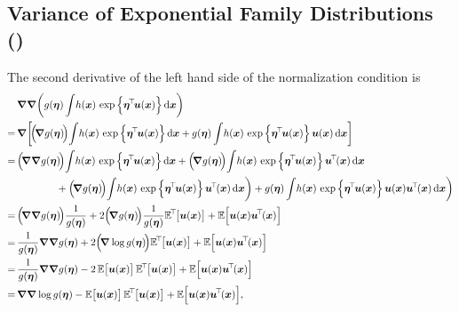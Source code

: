 \documentclass[11pt, a4paper]{scrartcl}
\newcommand{\E}{\mathbb{E}}
\newcommand{\transposed}{{\!\top\!}}
\renewcommand{\vec}[1]{\bm{#1}}
\newcommand{\diffstar}{\texorpdfstring{\raisebox{-1pt}{\resizebox{!}{8pt}{\(\star\)}}}{*}}
\newcommand{\onestar}  {(\diffstar)}
\begin{document}
		\subsection{Variance of Exponential Family Distributions  \onestar}
			The second derivative of the left hand side of the normalization condition is
			\begin{align}
				 &\, \grad \grad \bigg( g(\vec{\eta}) \int\! h(\vec{x}) \,\exp\Big\{ \vec{\eta}^\transposed \vec{u}(\vec{x}) \Big\} \dd{\vec{x}} \!\bigg) \\
				=&\, \grad \bigg[\! \Big(\! \grad{g(\vec{\eta})} \!\Big)\! \int\! h(\vec{x}) \,\exp\Big\{ \vec{\eta}^\transposed \vec{u}(\vec{x}) \Big\} \dd{\vec{x}} + g(\vec{\eta}) \int\! h(\vec{x}) \,\exp\Big\{ \vec{\eta}^\transposed \vec{u}(\vec{x}) \Big\}\, \vec{u}(\vec{x}) \dd{\vec{x}} \!\bigg] \\
				=&\, \Big(\! \grad{\grad{g(\vec{\eta})}} \!\Big)\! \int\! h(\vec{x}) \,\exp\Big\{ \vec{\eta}^\transposed \vec{u}(\vec{x}) \Big\} \dd{\vec{x}}
					+ \Big(\! \grad{g(\vec{\eta})} \!\Big)\! \int\! h(\vec{x}) \,\exp\Big\{ \vec{\eta}^\transposed \vec{u}(\vec{x}) \Big\}\, \vec{u}^\transposed(\vec{x}) \dd{\vec{x}} \\&\qquad\qquad
					+ \Big(\! \grad{g(\vec{\eta})} \!\Big)\! \int\! h(\vec{x}) \,\exp\Big\{ \vec{\eta}^\transposed \vec{u}(\vec{x}) \Big\}\, \vec{u}^\transposed(\vec{x}) \dd{\vec{x}} \!\bigg)
					+ g(\vec{\eta}) \int\! h(\vec{x}) \,\exp\Big\{ \vec{\eta}^\transposed \vec{u}(\vec{x}) \Big\}\, \vec{u}(\vec{x}) \vec{u}^\transposed(\vec{x}) \dd{\vec{x}} \!\bigg) \\
				=&\, \Big(\! \grad{\grad{g(\vec{\eta})}} \!\Big) \frac{1}{g(\vec{\eta})}
					+ 2 \Big(\! \grad{g(\vec{\eta})} \!\Big) \frac{1}{g(\vec{\eta})} \E^\transposed\big[ \vec{u}(\vec{x}) \big]
					+ \E\Big[ \vec{u}(\vec{x}) \vec{u}^\transposed(\vec{x}) \Big] \\
				=&\, \frac{1}{g(\vec{\eta})} \grad{\grad{g(\vec{\eta})}}
					+ 2 \Big(\! \grad{\log g(\vec{\eta})} \!\Big) \E^\transposed\big[ \vec{u}(\vec{x}) \big]
					+ \E\Big[ \vec{u}(\vec{x}) \vec{u}^\transposed(\vec{x}) \Big] \\
				=&\, \frac{1}{g(\vec{\eta})} \grad{\grad{g(\vec{\eta})}}
					- 2 \, \E\big[ \vec{u}(\vec{x}) \big] \, \E^\transposed\big[ \vec{u}(\vec{x}) \big]
					+ \E\Big[ \vec{u}(\vec{x}) \vec{u}^\transposed(\vec{x}) \Big] \\
				=&\, \grad{\grad{\log g(\vec{\eta})}}
					- \E\big[ \vec{u}(\vec{x}) \big] \, \E^\transposed\big[ \vec{u}(\vec{x}) \big]
					+ \E\Big[ \vec{u}(\vec{x}) \vec{u}^\transposed(\vec{x}) \Big],  \label{eq:2-58}
			\end{align}
\end{document}
